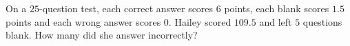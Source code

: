 On a $25$-question test, each correct answer scores $6$ points, each blank scores $1.5$ points and each wrong answer scores $0$. Hailey scored $109.5$ and left $5$ questions blank. How many did she answer incorrectly?
